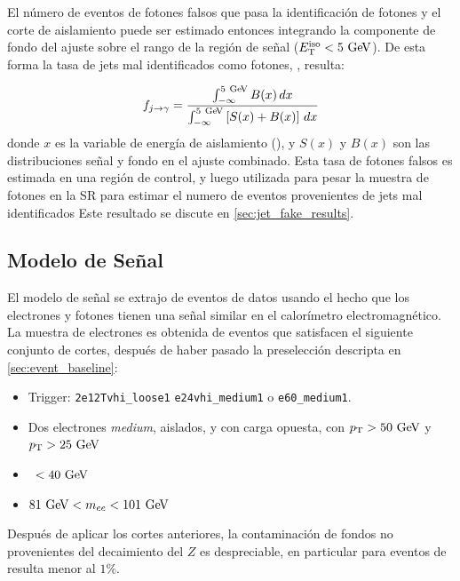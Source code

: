 El número de eventos de fotones falsos que pasa la identificación de fotones y
el corte de aislamiento puede ser estimado entonces integrando la componente de
fondo del ajuste sobre el rango de la región de señal ($\etiso<5\GeV$). De esta
forma la tasa de jets mal identificados como fotones, \fjg, resulta:

\begin{equation}\label{eq:jfake_formula}
    f_{j\to \gamma} = \frac{\int_{-\infty}^{5\gev} B(x)\, dx}{\int_{-\infty}^{5\gev} \left[S(x)+B(x)\right]\, dx}
\end{equation}
%
donde $x$ es la variable de energía de aislamiento (\etiso), y $S(x)$ y $B(x)$
son las distribuciones señal y fondo en el ajuste combinado. Esta tasa de
fotones falsos es estimada en una región de control, y luego utilizada para
pesar la muestra de fotones en la SR para estimar el numero de eventos
provenientes de jets mal identificados Este resultado se discute en
\cref{sec:jet_fake_results}.



\subsection{Modelo de Señal} \label{sec:jfake_sig_template}

El modelo de señal se extrajo de eventos de datos {\Zee} usando el hecho que los
electrones y fotones tienen una señal similar en el calorímetro
electromagnético. La muestra de electrones es obtenida de eventos que satisfacen
el siguiente conjunto de cortes, después de haber pasado la preselección
descripta en \cref{sec:event_baseline}:

\begin{itemize}\itemsep0.1cm
\item Trigger: \texttt{2e12Tvhi\_loose1} \texttt{e24vhi\_medium1} o
  \texttt{e60\_medium1}.
\item Dos electrones \emph{medium}, aislados, y con carga opuesta, con $\pt>50
  \gev$ y $\pt>25 \gev$
\item \MET\ $<40\gev$
\item $81\gev<m_{ee}<101\gev$
\end{itemize}

Después de aplicar los cortes anteriores, la contaminación de fondos no
provenientes del decaimiento del $Z$ es despreciable, en particular para eventos
de {\ttbar} resulta menor al $1\%$.

